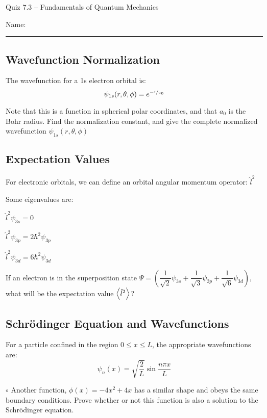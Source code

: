 \documentclass[11pt, letterpaper]{memoir}
\begin{document}
\begin{center}
	{\large Quiz 7.3 --	Fundamentals of Quantum Mechanics}
\end{center}
{\large Name: \rule[-1mm]{4in}{.1pt}

\subsection*{Wavefunction Normalization}
The wavefunction for a 1s electron orbital is:
\begin{equation*}
	\psi_{1s}(r,\theta,\phi) = e^{-\nicefrac{r}{a_0}}
\end{equation*}

\noindent
Note that this is a function in spherical polar coordinates, and that $a_0$ is the Bohr radius. Find the normalization constant, and give the complete normalized wavefunction $\psi_{1s}(r,\theta,\phi)$

\vspace{12em}
\subsection*{Expectation Values}
For electronic orbitals, we can define an orbital angular momentum operator: $\hat{l}^2$

\noindent Some eigenvalues are:

$\hat{l}^2\psi_{3s} = 0$

$\hat{l}^2\psi_{3p} = 2 \hbar^2\psi_{3p}$

$\hat{l}^2\psi_{3d} = 6 \hbar^2\psi_{3d}$

\noindent
If an electron is in the superposition state $\Psi = \left(\dfrac{1}{\sqrt{2}}\psi_{3s} + \dfrac{1}{\sqrt{3}}\psi_{3p} + \dfrac{1}{\sqrt{6}}\psi_{3d}\right)$, what will be the expectation value $\left< \hat{l}^2 \right>$?


\vspace{12em}
\subsection{Schr\"odinger Equation and Wavefunctions}

For a particle confined in the region $0\leq x \leq L$, the appropriate wavefunctions are:
\begin{equation*}
	\psi_n(x) = \sqrt{\dfrac{2}{L}}\sin{\frac{n\pi x}{L}}
\end{equation*}

\noindent
$\circ$ Another function, $\phi(x) = -4x^2+4x$ has a similar shape and obeys the same boundary conditions. Prove whether or not this function is also a solution to the Schr\"odinger equation.

}
\end{document}
